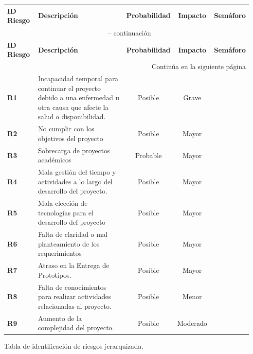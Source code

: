 \begin{longtable}{|m{1.5cm}|m{4.5cm}|c|c|c|}
	\hline
	\rowcolor{black!75} \color{white} \textbf{ID Riesgo} & \color{white} \textbf{Descripción} & \color{white} \textbf{Probabilidad} & \color{white} \textbf{Impacto} & \color{white} \textbf{Semáforo} \\ 
	\hline
	\endfirsthead
	\multicolumn{5}{c}{{\tablename\ \thetable{} -- continuación}} \\
	\hline
	\rowcolor{black!75} \color{white} \textbf{ID Riesgo} & \color{white} \textbf{Descripción} & \color{white} \textbf{Probabilidad} & \color{white} \textbf{Impacto} & \color{white} \textbf{Semáforo} \\ 
	\hline
	\endhead
	\hline \multicolumn{5}{r}{{Continúa en la siguiente página}} \\
	\endfoot
	\hline
	\endlastfoot
	
	\textbf{R1} & Incapacidad temporal para continuar el proyecto debido a una enfermedad u otra causa que afecte la salud o disponibilidad. & Posible & Grave & \cellcolor{red!80} \\ 
	\hline
	\textbf{R2} & No cumplir con los objetivos del proyecto & Posible & Mayor & \cellcolor{red!80} \\ 
	\hline
	\textbf{R3} & Sobrecarga de proyectos académicos & Probable & Mayor & \cellcolor{red!80} \\ 
	\hline
	\textbf{R4} & Mala gestión del tiempo y actividades a lo largo del desarrollo del proyecto. & Posible & Mayor & \cellcolor{orange!80} \\ 
	\hline
	\textbf{R5} & Mala elección de tecnologías para el desarrollo del proyecto & Posible & Mayor & \cellcolor{orange!80} \\ 
	\hline
	\textbf{R6} & Falta de claridad o mal planteamiento de los requerimientos & Posible & Mayor & \cellcolor{orange!80} \\ 
	\hline
	\textbf{R7} & Atraso en la Entrega de Prototipos. & Posible & Mayor & \cellcolor{orange!80} \\ 
	\hline
	\textbf{R8} & Falta de conocimientos para realizar actividades relacionadas al proyecto. & Posible & Menor & \cellcolor{yellow!60} \\ 
	\hline
	\textbf{R9} & Aumento de la complejidad del proyecto. & Posible & Moderado & \cellcolor{yellow!60} \\ 
	\hline
\end{longtable}
\caption{Tabla de identificación de riesgos jerarquizada.} \label{tabla:riesgos}
\vspace{0.5cm}

